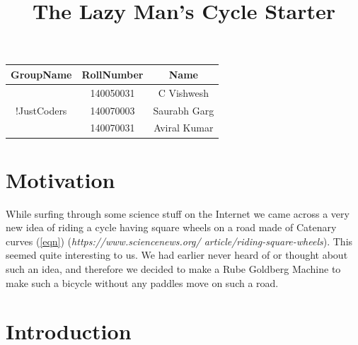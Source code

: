 \documentclass[12pt,a4paper]{article}
\begin{document}
\title{\color{red} The Lazy Man's Cycle Starter}
\maketitle

\begin{table}[ph]
\large
\centering
\begin{tabular}{c c c}
\hline
GroupName &RollNumber &Name\\
\hline 
\multirow{3}{*}{!JustCoders} &140050031 &C Vishwesh\\ &140070003 &Saurabh Garg\\&140070031 &Aviral Kumar\\
\hline
\end{tabular}
\end{table}
\pagebreak
\section{Motivation} \label{mot}

While surfing through some science stuff on the Internet we came across a very new idea of riding a cycle having square wheels on a road made of Catenary curves (\ref{eqn})
(\textit{https://www.sciencenews.org/ article/riding-square-wheels}). This seemed quite interesting to us. We had earlier never heard of or thought about such an idea, and therefore we decided to make a Rube Goldberg Machine to make such a bicycle without any paddles move on such a road. 
\section{Introduction} \label{intro}
\end{document}
